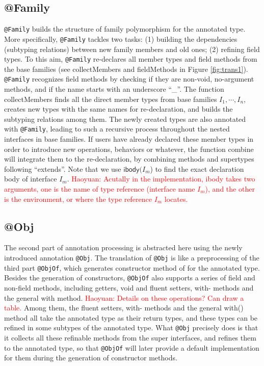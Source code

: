 \subsection{\textsf{@Family}}
\lstinline{@Family} builds the structure of family polymorphism for the annotated type. More specifically, \lstinline{@Family} tackles two
tasks: (1) building the dependencies (subtyping relations) between new family members and old ones; (2) refining field types. To this
aim, \lstinline{@Family} re-declares all member types and field methods from the base families (see \textsf{collectMembers} and \textsf{fieldMethods} in Figure \ref{fig:trans1}). \lstinline{@Family} recognizes field methods by checking if they are non-void, no-argument methods, and if the name starts with an underscore ``\_''.  The function \textsf{collectMembers} finds all the direct member types from base families $I_1,\cdots,I_n$, creates new types with the same names for re-declaration, and builds the subtyping relations among them. The newly created types are also annotated with \lstinline{@Family}, leading to such a recursive process throughout the nested interfaces in base families. If users have already declared these member types in order to introduce new operations, behaviors or whatever, the function \textsf{combine} will integrate them to the re-declaration, by combining methods and supertypes following ``extends''. Note that we use $\textsf{ibody(}I_m$\textsf{)} to find the exact declaration body of interface $I_m$. \textcolor{red}{Haoyuan: Acutally in the implementation, \textsf{ibody} takes two arguments, one is the name of type reference (interface name $I_m$), and the other is the environment, or where the type reference $I_m$ locates.}

\subsection{\textsf{@Obj}}
The second part of annotation processing is abstracted here using the newly introduced annotation
\lstinline{@Obj}. The translation of \lstinline{@Obj} is like a preprocessing of the third part \lstinline{@ObjOf},
which generates constructor method \textsf{of} for the annotated type. Besides the generation of constructors, \lstinline{@ObjOf} also supports
a series of field and non-field methods, including getters, void and fluent setters, \textsf{with}- methods and the general \textsf{with} method.
\textcolor{red}{Haoyuan: Details on these operations? Can draw a table.} Among them, the fluent setters, \textsf{with}- methods and the general \textsf{with()} method all take the annotated type as their return types, and these types can be refined in some subtypes of the annotated type. What \lstinline{@Obj} precisely does is that it collects all these refinable methods from the super interfaces, and refines them to the annotated type, so that \lstinline{@ObjOf} will later provide a default implementation for them during the generation of constructor methods.

